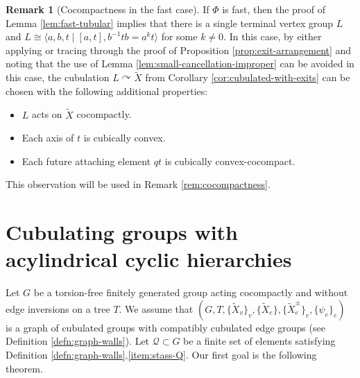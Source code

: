 \documentclass[11pt,oneside]{amsart}
\newcounter{ax}
\theoremstyle{definition}
\newtheorem{rem}[thm]{Remark}
\newcommand{\actson}{\curvearrowright}
\begin{document}
\begin{rem}[Cocompactness in the fast case]\label{rem:cocompactness-in-the-fast-case}
If $\Phi$ is fast, then the proof of Lemma \ref{lem:fast-tubular} implies that there is a single terminal vertex group $L$ and $L\cong \langle a,b,t\mid [a,t],b^{-1}tb=a^kt\rangle$ for some $k\neq 0$.  In this case, by either applying \cite[Cor. 5.10]{Wise:tubular} or tracing through the proof of Proposition \ref{prop:exit-arrangement} and noting that the use of Lemma \ref{lem:small-cancellation-improper} can be avoided in this case, the cubulation $L\actson \widetilde X$ from Corollary \ref{cor:cubulated-with-exits} can be chosen with the following additional properties:
\begin{itemize}
    \item $L$ acts on $\widetilde X$ cocompactly.
    \item Each axis of $t$ is cubically convex.
    \item Each future attaching element $qt$ is cubically convex-cocompact.
\end{itemize}
This observation will be used in Remark \ref{rem:cocompactness}.
\end{rem}

\section{Cubulating groups with acylindrical cyclic hierarchies}\label{subsec:acyl-cyclic}
Let $G$ be a torsion-free finitely generated group acting cocompactly and without edge inversions on a tree $T$.  We assume that $(G,T,\{\widetilde X_v\}_v,\{\widetilde X_e\},\{\widetilde X_e^\pm\}_e,\{\psi_e\}_e)$ is a graph of cubulated groups with compatibly cubulated edge groups (see Definition \ref{defn:graph-walls}).  Let $\mathcal Q\subset G$ be a finite set of elements satisfying Definition \ref{defn:graph-walls}.\eqref{item:stass-Q}.  Our first goal is the following theorem.
\end{document}
